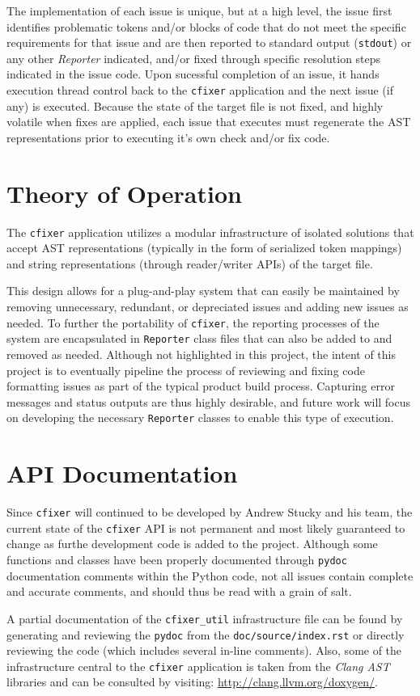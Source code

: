 \documentclass[11pt]{scrreprt}
\begin{document}
The implementation of each issue is unique, but at a high level, the issue first identifies problematic tokens and/or blocks of code that do not meet the specific requirements for that issue and are then reported to standard output (\texttt{stdout}) or any other \textit{Reporter} indicated, and/or fixed through specific resolution steps indicated in the issue code.
Upon sucessful completion of an issue, it hands execution thread control back to the \texttt{cfixer} application and the next issue (if any) is executed.
Because the state of the target file is not fixed, and highly volatile when fixes are applied, each issue that executes must regenerate the AST representations prior to executing it's own check and/or fix code.

\section{Theory of Operation}

The \texttt{cfixer} application utilizes a modular infrastructure of isolated solutions that accept AST representations (typically in the form of serialized token mappings) and string representations (through reader/writer APIs) of the target file.

This design allows for a plug-and-play system that can easily be maintained by removing unnecessary, redundant, or depreciated issues and adding new issues as needed.
To further the portability of \texttt{cfixer}, the reporting processes of the system are encapsulated in \texttt{Reporter} class files that can also be added to and removed as needed.
Although not highlighted in this project, the intent of this project is to eventually pipeline the process of reviewing and fixing code formatting issues as part of the typical product build process.
Capturing error messages and status outputs are thus highly desirable, and future work will focus on developing the necessary \texttt{Reporter} classes to enable this type of execution.

\section{API Documentation}
Since \texttt{cfixer} will continued to be developed by Andrew Stucky and his team, the current state of the \texttt{cfixer} API is not permanent and most likely guaranteed to change as furthe development code is added to the project.
Although some functions and classes have been properly documented through \texttt{pydoc} documentation comments within the Python code, not all issues contain complete and accurate comments, and should thus be read with a grain of salt.

A partial documentation of the \texttt{cfixer\_util} infrastructure file can be found by generating and reviewing the \texttt{pydoc} from the \texttt{doc/source/index.rst} or directly reviewing the code (which includes several in-line comments).
Also, some of the infrastructure central to the \texttt{cfixer} application is taken from the \textit{Clang AST} libraries and can be consulted by visiting:
\url{http://clang.llvm.org/doxygen/}.
\end{document}

